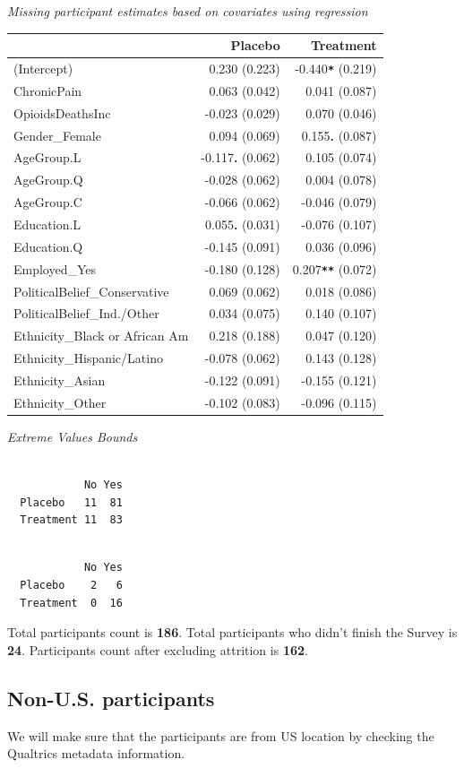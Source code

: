 \documentclass[
]{article}
\begin{document}
\emph{Missing participant estimates based on covariates using
regression}

\begin{longtable}[]{@{}lrr@{}}
\toprule
& Placebo & Treatment\tabularnewline
\midrule
\endhead
(Intercept) & 0.230 (0.223) & -0.440\textbf{\texttt{*}}
(0.219)\tabularnewline
ChronicPain & 0.063 (0.042) & 0.041 (0.087)\tabularnewline
OpioidsDeathsInc & -0.023 (0.029) & 0.070 (0.046)\tabularnewline
Gender\_Female & 0.094 (0.069) & 0.155\textbf{. } (0.087)\tabularnewline
AgeGroup.L & -0.117\textbf{. } (0.062) & 0.105 (0.074)\tabularnewline
AgeGroup.Q & -0.028 (0.062) & 0.004 (0.078)\tabularnewline
AgeGroup.C & -0.066 (0.062) & -0.046 (0.079)\tabularnewline
Education.L & 0.055\textbf{. } (0.031) & -0.076 (0.107)\tabularnewline
Education.Q & -0.145 (0.091) & 0.036 (0.096)\tabularnewline
Employed\_Yes & -0.180 (0.128) & 0.207\textbf{\texttt{**}}
(0.072)\tabularnewline
PoliticalBelief\_Conservative & 0.069 (0.062) & 0.018
(0.086)\tabularnewline
PoliticalBelief\_Ind./Other & 0.034 (0.075) & 0.140
(0.107)\tabularnewline
Ethnicity\_Black or African Am & 0.218 (0.188) & 0.047
(0.120)\tabularnewline
Ethnicity\_Hispanic/Latino & -0.078 (0.062) & 0.143
(0.128)\tabularnewline
Ethnicity\_Asian & -0.122 (0.091) & -0.155 (0.121)\tabularnewline
Ethnicity\_Other & -0.102 (0.083) & -0.096 (0.115)\tabularnewline
\bottomrule
\end{longtable}

\emph{Extreme Values Bounds}

\begin{verbatim}
           
            No Yes
  Placebo   11  81
  Treatment 11  83
\end{verbatim}

\begin{verbatim}
           
            No Yes
  Placebo    2   6
  Treatment  0  16
\end{verbatim}

Total participants count is \textbf{186}. Total participants who didn't
finish the Survey is \textbf{24}. Participants count after excluding
attrition is \textbf{162}.

\hypertarget{non-u.s.-participants}{%
\subsection{Non-U.S. participants}\label{non-u.s.-participants}}

We will make sure that the participants are from US location by checking
the Qualtrics metadata information.
\end{document}
